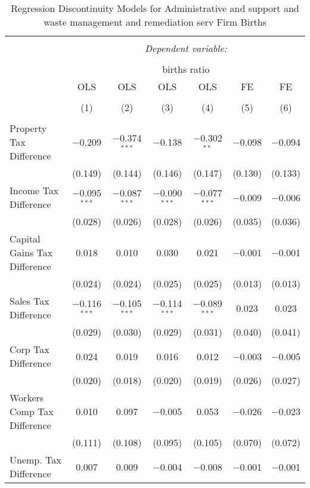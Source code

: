 
\begin{table}[!htbp] \centering 
  \caption{Regression Discontinuity Models for  Administrative and support and waste management and remediation serv Firm Births} 
  \label{56rd} 
\begin{tabular}{@{\extracolsep{5pt}}lcccccc} 
\\[-1.8ex]\hline 
\hline \\[-1.8ex] 
 & \multicolumn{6}{c}{\textit{Dependent variable:}} \\ 
\cline{2-7} 
\\[-1.8ex] & \multicolumn{6}{c}{births ratio} \\ 
 & OLS & OLS & OLS & OLS & FE & FE \\ 
\\[-1.8ex] & (1) & (2) & (3) & (4) & (5) & (6)\\ 
\hline \\[-1.8ex] 
 Property Tax Difference & $-$0.209 & $-$0.374$^{***}$ & $-$0.138 & $-$0.302$^{**}$ & $-$0.098 & $-$0.094 \\ 
  & (0.149) & (0.144) & (0.146) & (0.147) & (0.130) & (0.133) \\ 
  Income Tax Difference & $-$0.095$^{***}$ & $-$0.087$^{***}$ & $-$0.090$^{***}$ & $-$0.077$^{***}$ & $-$0.009 & $-$0.006 \\ 
  & (0.028) & (0.026) & (0.028) & (0.026) & (0.035) & (0.036) \\ 
  Capital Gains Tax Difference & 0.018 & 0.010 & 0.030 & 0.021 & $-$0.001 & $-$0.001 \\ 
  & (0.024) & (0.024) & (0.025) & (0.025) & (0.013) & (0.013) \\ 
  Sales Tax Difference & $-$0.116$^{***}$ & $-$0.105$^{***}$ & $-$0.114$^{***}$ & $-$0.089$^{***}$ & 0.023 & 0.023 \\ 
  & (0.029) & (0.030) & (0.029) & (0.031) & (0.040) & (0.041) \\ 
  Corp Tax Difference & 0.024 & 0.019 & 0.016 & 0.012 & $-$0.003 & $-$0.005 \\ 
  & (0.020) & (0.018) & (0.020) & (0.019) & (0.026) & (0.027) \\ 
  Workers Comp Tax Difference & 0.010 & 0.097 & $-$0.005 & 0.053 & $-$0.026 & $-$0.023 \\ 
  & (0.111) & (0.108) & (0.095) & (0.105) & (0.070) & (0.072) \\ 
  Unemp. Tax Difference & 0.007 & 0.009 & $-$0.004 & $-$0.008 & $-$0.001 & $-$0.001 \\ 

\end{tabular}
\end{table}
